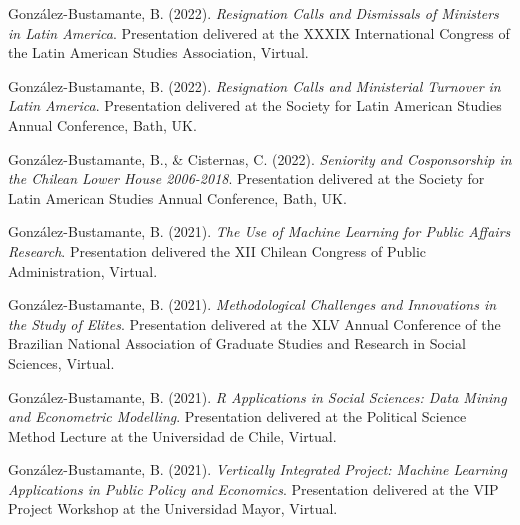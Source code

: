 \begin{publications}

\begin{benumerate}{66}

\item{\small González-Bustamante, B. (2022). {\itshape Resignation Calls and Dismissals of Ministers in Latin America}. Presentation delivered at the XXXIX International Congress of the Latin American Studies Association, Virtual.}\vspace{1mm}

\item{\small González-Bustamante, B. (2022). {\itshape Resignation Calls and Ministerial Turnover in Latin America}. Presentation delivered at the Society for Latin American Studies Annual Conference, Bath, UK.}\vspace{1mm}

\item{\small González-Bustamante, B., \& Cisternas, C. (2022). {\itshape Seniority and Cosponsorship in the Chilean Lower House 2006-2018}. Presentation delivered at the Society for Latin American Studies Annual Conference, Bath, UK.}\vspace{1mm}

\item{\small González-Bustamante, B. (2021). {\itshape The Use of Machine Learning for Public Affairs Research}. Presentation delivered the XII Chilean Congress of Public Administration, Virtual.}\vspace{1mm}

\item{\small González-Bustamante, B. (2021). {\itshape Methodological Challenges and Innovations in the Study of Elites}. Presentation delivered at the XLV Annual Conference of the Brazilian National Association of Graduate Studies and Research in Social Sciences, Virtual.}\vspace{1mm}


\item{\small González-Bustamante, B. (2021). {\itshape R Applications in Social Sciences: Data Mining and Econometric Modelling}. Presentation delivered at the Political Science Method Lecture at the Universidad de Chile, Virtual.}\vspace{1mm}

\item{\small González-Bustamante, B. (2021). {\itshape Vertically Integrated Project: Machine Learning Applications in Public Policy and Economics}. Presentation delivered at the VIP Project Workshop at the Universidad Mayor, Virtual.}\vspace{1mm}


\end{benumerate}
\end{publications}
